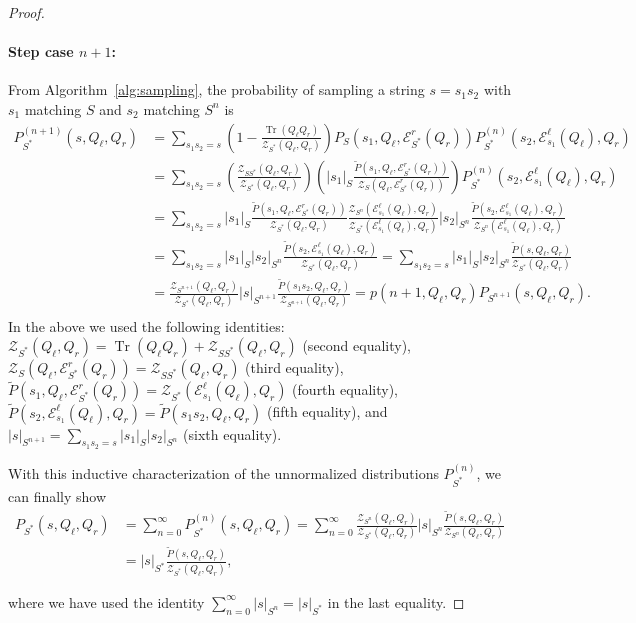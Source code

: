\documentclass[twoside]{article}
\DeclareMathOperator{\Tr}{Tr}
\newcommand{\EL}{\mc{E}^{\scriptstyle \ell}}
\newcommand{\ER}{\mc{E}^{\scriptstyle r}}
\newcommand{\QL}{Q_{\ell}}
\newcommand{\QR}{Q_{r}}
\newcommand{\Pt}{\tilde{P}}
\newcommand{\mc}[1]{\mathcal{#1}}
\begin{document}
\begin{proof}
\paragraph{\textbf{Step case} $n + 1$: } From Algorithm~\ref{alg:sampling}, 
the probability of sampling a string $s = s_1 s_2$ with $s_1$ matching $S$ and $s_2$ matching $S^{n}$ is
%
\begin{align*}
    P_{S^*}^{(n + 1)}\!(s, \QL, \QR) &= \sum_{s_1 s_2 = s} \left(1 - \frac{\Tr(\QL \QR)}{\mc{Z}_{S^*}(\QL, \QR)} \right) P_{S}(s_1, \QL, \ER_{S^*}(\QR)) P_{S^*}^{(n)}(s_2, \EL_{s_1}(\QL), \QR) \\ 
    &= \sum_{s_1 s_2 = s} \left(\frac{\mc{Z}_{SS^*}(\QL, \QR)}{\mc{Z}_{S^*}(\QL, \QR)} \right) \left(|s_1|_{S} \frac{\Pt(s_1, \QL, \ER_{S^*}(\QR))}{\mc{Z}_S(\QL, \ER_{S^*}(\QR))}\right) P_{S^*}^{(n)}(s_2, \EL_{s_1}(\QL), \QR) \\
    &= \sum_{s_1 s_2 = s} |s_1|_{S} \frac{\Pt(s_1, \QL, \ER_{S^*}(\QR))}{\mc{Z}_{S^*}(\QL, \QR)} \frac{\mc{Z}_{S^n}(\EL_{s_1}(\QL), \QR)}{\mc{Z}_{S^*}(\EL_{s_1}(\QL), \QR)} |s_2|_{S^n} \frac{\Pt(s_2, \EL_{s_1}(\QL), \QR)}{\mc{Z}_{S^n}(\EL_{s_1}(\QL), \QR)} \\
    &= \sum_{s_1 s_2 = s} |s_1|_{S} |s_2|_{S^n} \frac{\Pt(s_2, \EL_{s_1}(\QL), \QR)}{\mc{Z}_{S^*}(\QL, \QR)} = \sum_{s_1 s_2 = s} |s_1|_{S} |s_2|_{S^n} \frac{\Pt(s, \QL, \QR)}{\mc{Z}_{S^*}(\QL, \QR)} \\
    &= \frac{\mc{Z}_{S^{n+1}}(\QL, \QR)}{\mc{Z}_{S^*}(\QL, \QR)} |s|_{S^{n+1}} \frac{\Pt(s_1 s_2, \QL, \QR)}{\mc{Z}_{S^{n+1}}(\QL, \QR)} = p(n+1, \QL, \QR) P_{S^{n+1}}(s, \QL, \QR). \\
\end{align*}
%
In the above we used the following identities: $\mc{Z}_{S^*}(\QL, \QR) = \Tr(\QL \QR) + \mc{Z}_{SS^*}(\QL, \QR)$ (second equality), $\mc{Z}_S(\QL, \ER_{S^*}(\QR)) = \mc{Z}_{SS^*}(\QL, \QR)$ (third equality), $\Pt(s_1, \QL, \ER_{S^*}(\QR)) = \mc{Z}_{S^*}(\EL_{s_1}(\QL), \QR)$ (fourth equality), $\Pt(s_2, \EL_{s_1}(\QL), \QR) = \Pt(s_1 s_2, \QL, \QR)$ (fifth equality), and $|s|_{S^{n+1}} = \sum_{s_1 s_2 = s} |s_1|_{S} |s_2|_{S^n}$ (sixth equality).

With this inductive characterization of the unnormalized distributions $P_{S^*}^{(n)}$, we can finally show
%
\begin{align*}
    P_{S^*}(s, \QL, \QR) &= \sum_{n = 0}^\infty P_{S^*}^{(n)}(s, \QL, \QR) = \sum_{n = 0}^\infty \frac{\mc{Z}_{S^{n}}(\QL, \QR)}{\mc{Z}_{S^*}(\QL, \QR)} |s|_{S^{n}} \frac{\Pt(s, \QL, \QR)}{\mc{Z}_{S^{n}}(\QL, \QR)} \\
    &= |s|_{S^*} \frac{\Pt(s, \QL, \QR)}{\mc{Z}_{S^*}(\QL, \QR)},
\end{align*}

where we have used the identity $\sum_{n = 0}^\infty |s|_{S^{n}} = |s|_{S^*}$ in the last equality.

\end{proof}
\end{document}
